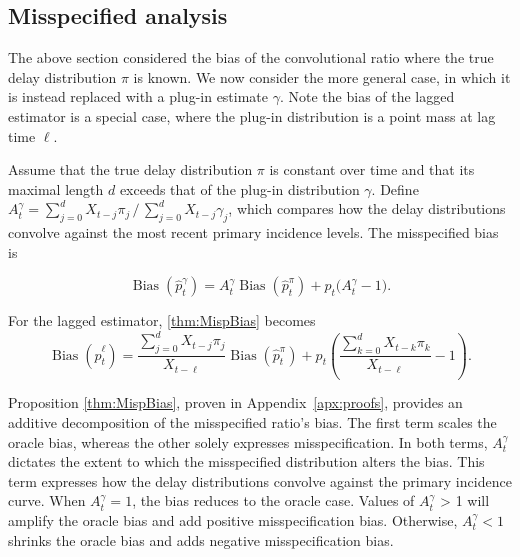 \documentclass{article}
\renewcommand{\hat}{\widehat} %
\DeclareMathOperator{\bias}{Bias}
\begin{document}
\subsection{Misspecified analysis}\label{sec:misp}

The above section considered the bias of the convolutional ratio where the true delay distribution $\pi$ is known. We now consider the more general case, in which it is instead replaced with a plug-in estimate $\gamma$. Note the bias of the lagged estimator is a special case, where the plug-in distribution is a point mass at lag time $\ell$. 

\begin{proposition}\label{thm:MispBias}
Assume that the true delay distribution $\pi$ is constant over time and that its maximal length $d$ exceeds that of the plug-in distribution $\gamma$. 
Define $A_t^\gamma = \sum_{j=0}^d X_{t-j}\pi_j\, \big/\, \sum_{j=0}^d X_{t-j}\gamma_j$, which compares how the delay distributions convolve against the most recent primary incidence levels. The misspecified bias is

\begin{equation*}
          \bias\left(\hat{p}_t^\gamma\right) = A_t^\gamma\bias\left(\hat{p}_t^\pi\right) + p_t\big( A_t^\gamma-1\big).
\end{equation*}
\end{proposition}

For the lagged estimator, \eqref{thm:MispBias} becomes
\begin{equation}\label{eq:LagBias}
         \bias\left(\hat{p}_t^\ell\right) = \frac{\sum_{j=0}^d X_{t-j}\pi_j}{X_{t-\ell}}\bias\left(\hat{p}_t^\pi\right) + p_t\left( \frac{\sum_{k=0}^d X_{t-k}\pi_k}{X_{t-\ell}}-1\right).
\end{equation}

Proposition \ref{thm:MispBias}, proven in Appendix~\ref{apx:proofs}, provides an
additive decomposition of the misspecified ratio's bias. The first term scales the oracle bias, whereas the other solely expresses misspecification.  
In both terms, $A_t^\gamma$ dictates the extent to which the misspecified distribution alters the bias. 
This term expresses how the delay distributions convolve against the primary incidence curve. 
When $A_t^\gamma=1$, the bias reduces to the oracle case. Values of $A_t^\gamma$ > 1 will amplify the oracle bias and add positive misspecification bias. 
Otherwise, $A_t^\gamma<1$ shrinks the oracle bias and adds negative misspecification bias.
\end{document}
